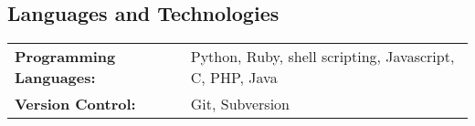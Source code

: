 \documentclass[centered,overlapped]{res}
\begin{document}
\begin{resume}
\section{Languages and Technologies}
\noindent
\begin{tabular}{@{} l l}
  \textbf{Programming Languages:} & Python, Ruby, shell scripting, Javascript,
    C, PHP, Java \\
  \textbf{Version Control:} & Git, Subversion \\
\end{tabular}

\end{resume}
\end{document}
